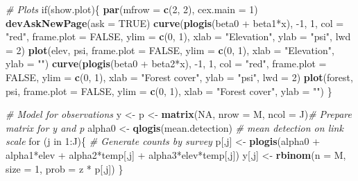 \documentclass[]{book}
\newenvironment{Shaded}{\begin{snugshade}}{\end{snugshade}}
\newcommand{\KeywordTok}[1]{\textcolor[rgb]{0.13,0.29,0.53}{\textbf{{#1}}}}
\newcommand{\DataTypeTok}[1]{\textcolor[rgb]{0.13,0.29,0.53}{{#1}}}
\newcommand{\DecValTok}[1]{\textcolor[rgb]{0.00,0.00,0.81}{{#1}}}
\newcommand{\StringTok}[1]{\textcolor[rgb]{0.31,0.60,0.02}{{#1}}}
\newcommand{\CommentTok}[1]{\textcolor[rgb]{0.56,0.35,0.01}{\textit{{#1}}}}
\newcommand{\OtherTok}[1]{\textcolor[rgb]{0.56,0.35,0.01}{{#1}}}
\newcommand{\NormalTok}[1]{{#1}}
\begin{document}
\begin{Shaded}
\begin{Highlighting}[]
\CommentTok{# Plots}
\NormalTok{if(show.plot)\{}
  \KeywordTok{par}\NormalTok{(}\DataTypeTok{mfrow =} \KeywordTok{c}\NormalTok{(}\DecValTok{2}\NormalTok{, }\DecValTok{2}\NormalTok{), }\DataTypeTok{cex.main =} \DecValTok{1}\NormalTok{)}
  \KeywordTok{devAskNewPage}\NormalTok{(}\DataTypeTok{ask =} \OtherTok{TRUE}\NormalTok{)}
  \KeywordTok{curve}\NormalTok{(}\KeywordTok{plogis}\NormalTok{(beta0 +}\StringTok{ }\NormalTok{beta1*x), -}\DecValTok{1}\NormalTok{, }\DecValTok{1}\NormalTok{, }\DataTypeTok{col =} \StringTok{"red"}\NormalTok{, }\DataTypeTok{frame.plot =} \OtherTok{FALSE}\NormalTok{, }
      \DataTypeTok{ylim =} \KeywordTok{c}\NormalTok{(}\DecValTok{0}\NormalTok{, }\DecValTok{1}\NormalTok{), }\DataTypeTok{xlab =} \StringTok{"Elevation"}\NormalTok{, }\DataTypeTok{ylab =} \StringTok{"psi"}\NormalTok{, }\DataTypeTok{lwd =} \DecValTok{2}\NormalTok{)}
  \KeywordTok{plot}\NormalTok{(elev, psi, }\DataTypeTok{frame.plot =} \OtherTok{FALSE}\NormalTok{, }\DataTypeTok{ylim =} \KeywordTok{c}\NormalTok{(}\DecValTok{0}\NormalTok{, }\DecValTok{1}\NormalTok{), }\DataTypeTok{xlab =} \StringTok{"Elevation"}\NormalTok{, }
     \DataTypeTok{ylab =} \StringTok{""}\NormalTok{)}
  \KeywordTok{curve}\NormalTok{(}\KeywordTok{plogis}\NormalTok{(beta0 +}\StringTok{ }\NormalTok{beta2*x), -}\DecValTok{1}\NormalTok{, }\DecValTok{1}\NormalTok{, }\DataTypeTok{col =} \StringTok{"red"}\NormalTok{, }\DataTypeTok{frame.plot =} \OtherTok{FALSE}\NormalTok{, }
      \DataTypeTok{ylim =} \KeywordTok{c}\NormalTok{(}\DecValTok{0}\NormalTok{, }\DecValTok{1}\NormalTok{), }\DataTypeTok{xlab =} \StringTok{"Forest cover"}\NormalTok{, }\DataTypeTok{ylab =} \StringTok{"psi"}\NormalTok{, }\DataTypeTok{lwd =} \DecValTok{2}\NormalTok{)}
  \KeywordTok{plot}\NormalTok{(forest, psi, }\DataTypeTok{frame.plot =} \OtherTok{FALSE}\NormalTok{, }\DataTypeTok{ylim =} \KeywordTok{c}\NormalTok{(}\DecValTok{0}\NormalTok{, }\DecValTok{1}\NormalTok{), }\DataTypeTok{xlab =} \StringTok{"Forest cover"}\NormalTok{, }
     \DataTypeTok{ylab =} \StringTok{""}\NormalTok{)}
\NormalTok{\}}

\CommentTok{# Model for observations}
\NormalTok{y <-}\StringTok{ }\NormalTok{p <-}\StringTok{ }\KeywordTok{matrix}\NormalTok{(}\OtherTok{NA}\NormalTok{, }\DataTypeTok{nrow =} \NormalTok{M, }\DataTypeTok{ncol =} \NormalTok{J)}\CommentTok{# Prepare matrix for y and p}
\NormalTok{alpha0 <-}\StringTok{ }\KeywordTok{qlogis}\NormalTok{(mean.detection)        }\CommentTok{# mean detection on link scale}
\NormalTok{for (j in }\DecValTok{1}\NormalTok{:J)\{                         }\CommentTok{# Generate counts by survey}
   \NormalTok{p[,j] <-}\StringTok{ }\KeywordTok{plogis}\NormalTok{(alpha0 +}\StringTok{ }\NormalTok{alpha1*elev +}\StringTok{ }\NormalTok{alpha2*temp[,j] +}\StringTok{ }\NormalTok{alpha3*elev*temp[,j])}
   \NormalTok{y[,j] <-}\StringTok{ }\KeywordTok{rbinom}\NormalTok{(}\DataTypeTok{n =} \NormalTok{M, }\DataTypeTok{size =} \DecValTok{1}\NormalTok{, }\DataTypeTok{prob =} \NormalTok{z *}\StringTok{ }\NormalTok{p[,j])}
\NormalTok{\}}


\end{Highlighting}
\end{Shaded}
\end{document}
